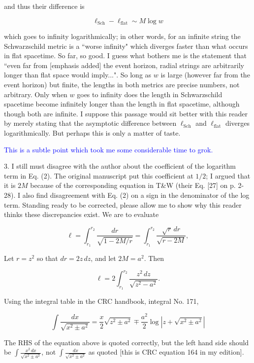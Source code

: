 \documentclass[12pt]{article}
\begin{document}
and thus their difference is

\[
\ell_\mathrm{Sch} - \ell_\mathrm{flat}\sim M\log w
\]

which goes to infinity logarithmically; in other words, for an
infinite string the Schwarzschild metric is a ``worse infinity" which
diverges faster than what occurs in flat spacetime.  So far, so good.
I guess what bothers me is the statement that ``even far from [emphasis
  added] the event horizon, radial strings are arbitrarily longer than
flat space would imply...".  So long as $w$ is large (however far from
the event horizon) but finite, the lengths in both metrics are precise
numbers, not arbitrary.  Only when $w$ goes to infinity does the
length in Schwarzschild spacetime become infinitely longer than the
length in flat spacetime, although though both are infinite.  I
suppose this passage would sit better with this reader by merely
stating that the asymptotic difference between $\ell_\mathrm{Sch}$ and
$\ell_\mathrm{flat}$ diverges logarithmically.  But perhaps this is
only a matter of taste.

\textcolor{blue}{ This is a subtle point which took me some
  considerable time to grok.
}

3. I still must disagree with the author about the coefficient of the
logarithm term in Eq. (2).  The original manuscript put this
coefficient at $1/2$; I argued that it is $2M$ because of the
corresponding equation in T\&W (their Eq. [27] on p. 2-28).  I also
find disagreement with Eq. (2) on a sign in the denominator of the log
term.  Standing ready to be corrected, please allow me to show why
this reader thinks these discrepancies exist.  We are to evaluate

\[
\ell=\int_{r_1}^{r_2}\frac{dr}{\sqrt{1-2M/r}} =
\int_{r_1}^{r_2}\frac{\sqrt{r}\,dr}{\sqrt{r-2M}},
\]

Let $r=z^2$ so that $dr=2z\,dz$, and let $2M=a^2$.  Then 

\[
\ell=2\int_{r_1}^{r_2} \frac{z^2\,dz}{\sqrt{z^2-a^2}}.
\]

 Using the integral table in the CRC handbook, integral No. 171,

\[
\int\frac{dx}{\sqrt{x^2\pm a^2}}=\frac{x}{2} \sqrt{z^2\pm a^2}
\mp \frac{a^2}{2}\log\left| z+\sqrt{x^2\pm a^2}\right|
\]


{\color{blue} The RHS of the equation above is quoted correctly, but
  the left hand side should be $\int\frac{x^2\,dx}{\sqrt{x^2\pm
      a^2}}$, not $\int\frac{dx}{\sqrt{x^2\pm a^2}}$ as quoted [this
    is CRC equation 164 in my edition].  }
\end{document}
